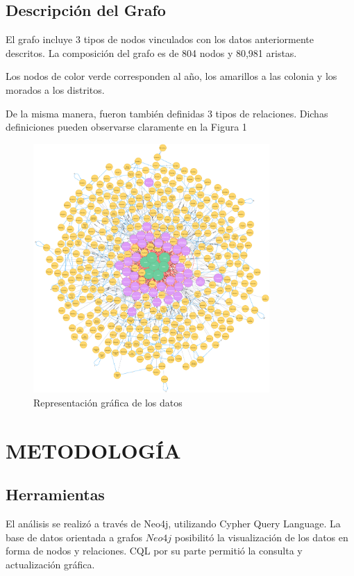 \documentclass[letterpaper, 10 pt, conference]{ieeeconf}  %
\begin{document}
\subsection{Descripci\'on del Grafo}
El grafo incluye 3 tipos de nodos vinculados con los datos anteriormente descritos. La composici\'on del grafo es de  804 nodos y 80,981 aristas.



Los nodos de color verde corresponden al a\~no, los amarillos a las colonia y los morados a los distritos.

De la misma manera, fueron tambi\'en definidas 3 tipos de relaciones. Dichas definiciones pueden observarse claramente en la Figura 1



\begin{figure}[ht]
\includegraphics[width=9cm]{graph_all.png}
\caption{Representaci\'on gr\'afica de los datos}
\label{tab:grafo}
\end{figure}

\section{METODOLOG\'IA}
\vspace{2mm}

\subsection{Herramientas}

El análisis se realiz\'o a trav\'es de Neo4j, utilizando Cypher Query Language. La base de datos orientada a grafos $Neo4j$ posibilit\'o la visualizaci\'on de los datos en forma de nodos y relaciones. CQL por su parte permiti\'o la consulta y actualizaci\'on gr\'afica.
\end{document}
